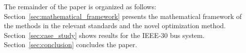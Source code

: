 The remainder of the paper is organized as follows: Section~\ref{sec:mathematical_framework} presents the mathematical framework of the methods in the relevant standards and the novel optimization method. Section~\ref{sec:case_study} shows results for the IEEE-30 bus system. Section~\ref{sec:conclusion} concludes the paper.